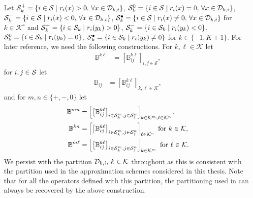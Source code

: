 Let \(\mathcal{S}_k^+=\{i\in\mathcal{S}\mid r_i(x)>0,\,\forall x \in\mathcal{D}_{k,i}\}\), \(\mathcal{S}_k^0=\{i\in\mathcal{S}\mid r_i(x)=0,\,\forall x \in\mathcal{D}_{k,i}\}\), \(\mathcal{S}_k^-=\{i\in\mathcal{S}\mid r_i(x)<0,\,\forall x \in\mathcal{D}_{k,i}\}\), \(\mathcal{S}_k^\bullet=\{i\in\mathcal{S}\mid r_i(x)\neq0,\,\forall x \in\mathcal{D}_{k,i}\}\) for \(k\in\mathcal K^\circ\) and \(\mathcal{S}_{k}^+=\{i\in\mathcal{S}_{k}\mid r_i(y_{k})>0\}\), \(\mathcal{S}_{k}^-=\{i\in\mathcal{S}_{k}\mid r_i(y_{k})<0\}\), \(\mathcal{S}_{k}^0=\{i\in\mathcal{S}_{k}\mid r_i(y_{k})=0\}\), \(\mathcal{S}_{k}^\bullet=\{i\in\mathcal{S}_{k}\mid r_i(y_{k})\neq 0\}\) for \(k\in\{-1,K+1\}\). For later reference, we need the following constructions. For \(k,\ell\in\mathcal K\) let
\begin{align}
	\mathbb B^{k\ell} & = \left[\mathbb B_{ij}^{k\ell}\right]_{i,j\in\mathcal S},\label{eqn:ref1here}
\end{align}
for \(i,j\in\mathcal{S}\) let 
\begin{align}
	\mathbb B_{ij} & = \left[\mathbb B_{ij}^{k\ell}\right]_{k,\ell \in \mathcal K},
\end{align}
and for \(m,n\in\{+,-,0\}\) let
\begin{align}
	\mathbb B^{m n} &= \left[\left[\mathbb B_{ij}^{k\ell}\right]_{i\in\mathcal{S}_k^m,j\in\mathcal{S}_\ell^n}\right]_{k\in\mathcal K^m,\ell\in\mathcal K^n},\label{eqn: Bmn2 etc}
	\\ \mathbb B^{k n} &= \left[\left[\mathbb B_{ij}^{k\ell}\right]_{i\in\mathcal{S}_k^m,j\in\mathcal{S}_\ell^n}\right]_{\ell\in\mathcal K^n} \mbox{ for }k\in\mathcal K,
	\\ \mathbb B^{m \ell} &= \left[\left[\mathbb B_{ij}^{k\ell}\right]_{i\in\mathcal{S}_k^m,j\in\mathcal{S}_\ell^n}\right]_{k\in\mathcal K^m} \mbox{ for } \ell\in\mathcal K.
	\label{eqn:ref2here}
\end{align}
We persist with the partition \(\mathcal{D}_{k,i},\,k\in\mathcal K\) throughout as this is consistent with the partition used in the approximation schemes considered in this thesis. Note that for all the operators defined with this partition, the partitioning used in \citep{bo2014} can always be recovered by the above construction. 

